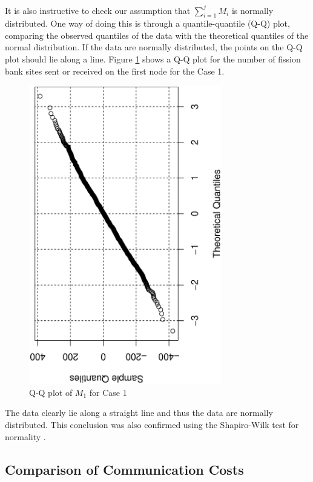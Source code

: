 It is also instructive to check our assumption that $\sum_{i=1}^j M_i$
is normally distributed. One way of doing this is through a
quantile-quantile (Q-Q) plot, comparing the observed quantiles of the
data with the theoretical quantiles of the normal distribution. If the
data are normally distributed, the points on the Q-Q plot should lie
along a line. Figure \ref{fig:QQ-plot} shows a Q-Q plot for the number
of fission bank sites sent or received on the first node for the Case
1.
\begin{figure}[h!]
  \centering
  \includegraphics[width=0.75\textwidth,angle=-90]{figures/QQ_plot/QQplot.eps}
  \caption{Q-Q plot of $M_1$ for Case 1}
  \label{fig:QQ-plot}
\end{figure}
The data clearly lie along a straight line and thus the data are
normally distributed. This conclusion was also confirmed using the
Shapiro-Wilk test for normality \cite{shapiro-wilk}.

\subsection{Comparison of Communication Costs}

